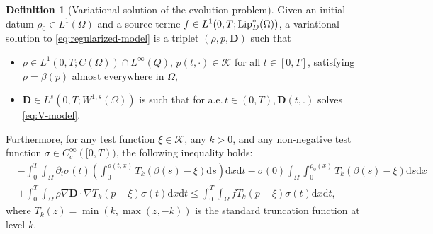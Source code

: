 \documentclass[final,reqno]{amsart}
\theoremstyle{plain}
\theoremstyle{definition}
\newtheorem{definition}{Definition}	%
\theoremstyle{remark}
\numberwithin{remark}{section}	%
\numberwithin{example}{section}	%
\newcommand{\de}{\mathbf{D}}
\newcommand{\K}{\mathcal K}
\newcommand{\Om}{\Omega}
\newcommand{\pp}{a.e.\,}
\newcommand{\Lip}{\textup{Lip}}
\newcommand{\dd}{\mathrm{d}}
\begin{document}
\begin{definition}[Variational solution of the evolution problem]\label{def:var-sol-regularized-model}
    Given an initial datum $\rho_0\in L^{1}(\Om)$ and a source terme $f\in L^{1}(0,T;\Lip_{D}^{*}(\Om))$, a variational solution to \eqref{eq:regularized-model} is a triplet $(\rho,p,\de)$ such that
    \begin{itemize}
    	\item $\rho \in L^1(0,T; C(\Omega)) \cap L^\infty(Q)$,   $p(t, \cdot) \in \K$ for all $t \in [0,T]$, satisfying $\rho = \beta(p)$ almost everywhere in $\Omega$,
    	\item $\de\in L^{s}(0,T;W^{1,s}(\Om))$ is such that for \pp $t\in (0,T), \de(t,.)$ solves \eqref{eq:V-model}.
    	\end{itemize}
    	Furthermore, for any test function $\xi \in \K$, any $k > 0$, and any non-negative test function $\sigma \in C^{\infty}_{c}([0,T))$, the following inequality holds:
    \begin{equation}
        \begin{aligned}
            &-\int_{0}^{T} \int_{\Om} \partial_{t}\sigma(t) \left( \int_{0}^{\rho(t,x)} T_{k}(\beta(s)-\xi)\dd s \right) \dd x \dd t - \sigma(0)\int_{\Om}\int_{0}^{\rho_0(x)} T_{k}(\beta(s)-\xi)\dd s\dd x\\
            &+ \int_{0}^{T} \int_{\Omega} \rho \nabla\de \cdot \nabla T_k(p-\xi) \sigma(t) \dd x \dd t 
            \leq \int_{0}^{T} \int_{\Om} f T_{k}(p-\xi) \sigma(t) \dd x \dd t,
        \end{aligned}
    \end{equation}
    where $T_k(z) = \min(k, \max(z,-k))$ is the standard truncation function at level $k$.
\end{definition}
\end{document}
